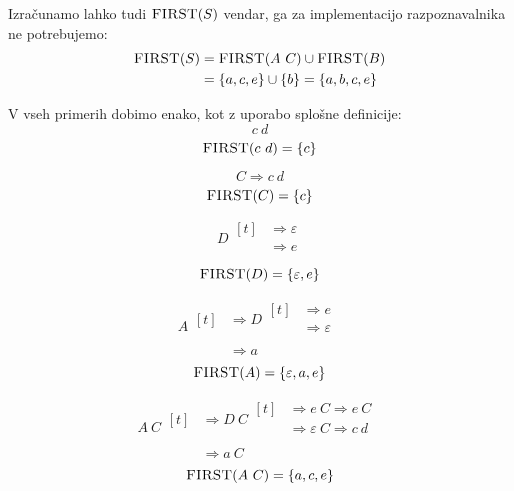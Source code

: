\documentclass{article}
\newcommand{\FIRST}{\textsc{FIRST}}
\newcommand{\Null}{\varepsilon}
\newcommand{\Derive}{\Rightarrow}
\newcommand{\Seq}{\ }
\begin{document}
Izračunamo lahko tudi $\FIRST(S)$ vendar, ga za implementacijo razpoznavalnika ne potrebujemo:
\begin{align*}
  \FIRST(S) &= \FIRST(A \Seq C) \cup \FIRST(B) \\
            &= \{a, c, e\} \cup \{b\} = \{a, b, c, e\}
\end{align*}

V vseh primerih dobimo enako, kot z uporabo splošne definicije:
\begin{equation*}
  c \Seq d
\end{equation*}
\begin{equation*}
  \FIRST(c \Seq d) = \{c\}
\end{equation*}

\begin{equation*}
  C \Derive c \Seq d
\end{equation*}
\begin{equation*}
  \FIRST(C) = \{c\}
\end{equation*}

\begin{equation*}
  D \begin{aligned}[t]
    &\Derive \Null\\
    &\Derive e\\
  \end{aligned}
\end{equation*}
\begin{equation*}
  \FIRST(D) = \{\Null, e\}
\end{equation*}

\begin{equation*}
  A \begin{aligned}[t]
    &\Derive D \begin{aligned}[t]
      &\Derive e \\
      &\Derive \Null\\
    \end{aligned}\\
    &\Derive a
  \end{aligned}
\end{equation*}
\begin{equation*}
  \FIRST(A) = \{\Null, a, e\}
\end{equation*}

\begin{equation*}
  A \Seq C \begin{aligned}[t]
    &\Derive D \Seq C \begin{aligned}[t]
      &\Derive e \Seq C \Derive e \Seq C \\
      &\Derive \Null \Seq C \Derive c \Seq d \\
    \end{aligned}\\
    &\Derive a \Seq C
  \end{aligned}
\end{equation*}
\begin{equation*}
  \FIRST(A \Seq C) = \{a, c, e\}
\end{equation*}
\end{document}

